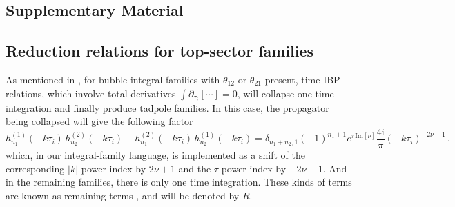 \documentclass[%
 reprint,
 amsmath,amssymb,
 aps,
prd,
]{revtex4-2}
\def\bge{\begin{equation}}
\def\ede{\end{equation}}
\def\pd{\partial}
\def\ii{\mathrm{i}}
\def\to{\rightarrow}
\begin{document}


\clearpage
\appendix
\begin{widetext}
\section*{Supplementary Material}
\subsection{Reduction relations for top-sector families}
As mentioned in \cite{Chen:2023iix}, for bubble integral families with $\theta_{12}$ or $\theta_{21}$ present, time IBP relations, which involve total derivatives $\int \pd_{\tau_i}[\cdots]=0$, will collapse one time integration and finally produce tadpole families. In this case, the propagator being collapsed will give the following factor
\bge
h_{n_1}^{(1)}(-k\tau_i)\,h_{n_2}^{(2)}(-k\tau_i) - h_{n_1}^{(2)}(-k\tau_i)\,h_{n_2}^{(1)}(-k\tau_i)
= \delta_{n_1+ n_2,1} (-1)^{n_1+1}e^{ \pi \text{Im}[\nu]} \frac{  4 \ii }{\pi}  (-k\tau_i)^{-2\nu-1} \,.  \label{eq_propcontract_app}
\ede
which, in our integral-family language, is implemented as a shift of the corresponding $|k|$-power index by $2\nu+1$ and the $\tau$-power index by $-2\nu-1$. And in the remaining families, there is only one time integration. These kinds of terms are known as remaining terms \cite{Chen:2023iix}, and will be denoted by $R$.




\end{widetext}
\end{document}
